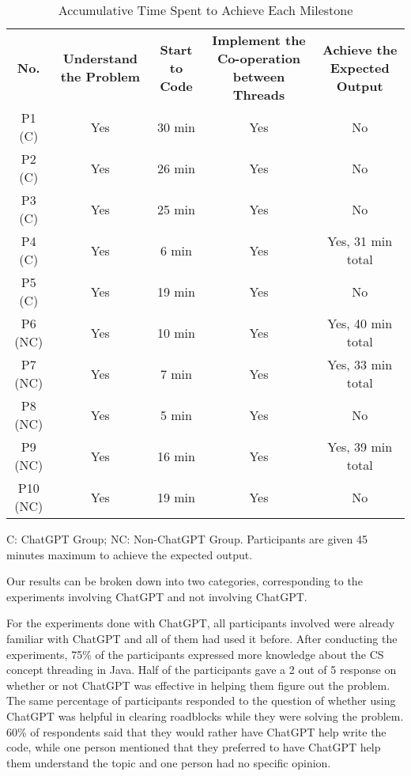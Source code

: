 \documentclass[manuscript,screen,nonacm]{acmart}
\begin{document}
\begin{table*} [th!]
  \caption{Accumulative Time Spent to Achieve Each Milestone}
  \label{tab:result}
  \begin{tabular}{ccccc}
    \toprule
    \multirow{2}{4em}{\textbf{No.}} & \multirow{2}{8em}{\textbf{Understand the Problem}} & \multirow{2}{6em}{\textbf{Start to Code}} & \multirow{2}{14em}{\textbf{Implement the Co-operation between Threads}} & \multirow{2}{8em}{\textbf{Achieve the Expected Output}} \\
    \\
    \midrule
    \midrule
    P1 (C) & Yes & 30 min & Yes & No\\
    \midrule
    P2 (C)  & Yes & 26 min & Yes & No\\
    \midrule
    P3 (C)  & Yes & 25 min & Yes & No\\
    \midrule
    P4 (C)  & Yes & 6 min & Yes & Yes, 31 min total\\
    \midrule
    P5 (C)  & Yes & 19 min & Yes & No\\
    \midrule
    P6 (NC)  & Yes & 10 min & Yes & Yes, 40 min total\\
    \midrule
    P7 (NC) & Yes & 7 min & Yes & Yes, 33 min total\\
    \midrule
    P8 (NC) & Yes & 5 min & Yes & No\\
    \midrule
    P9 (NC) & Yes & 16 min & Yes & Yes, 39 min total\\
    \midrule
    P10 (NC) & Yes & 19 min & Yes & No\\
    \bottomrule
  \end{tabular}
  
  \vspace{5pt}
  \footnotesize{C: ChatGPT Group; NC: Non-ChatGPT Group. Participants are given 45 minutes maximum to achieve the expected output.}
\end{table*}


Our results can be broken down into two categories, corresponding to the experiments involving ChatGPT and not involving ChatGPT. 

For the experiments done with ChatGPT, all participants involved were already familiar with ChatGPT and all of them had used it before. After conducting the experiments, 75\% of the participants expressed more knowledge about the CS concept threading in Java. Half of the participants gave a 2 out of 5 response on whether or not ChatGPT was effective in helping them figure out the problem. The same percentage of participants responded to the question of whether using ChatGPT was helpful in clearing roadblocks while they were solving the problem. 60\% of respondents said that they would rather have ChatGPT help write the code, while one person mentioned that they preferred to have ChatGPT help them understand the topic and one person had no specific opinion. 
 
\end{document}
